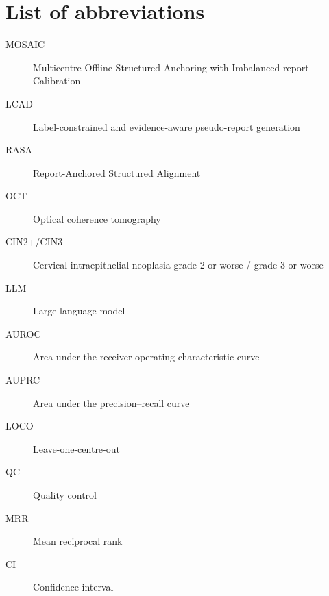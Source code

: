 \section*{List of abbreviations}
\begin{description}
  \item[MOSAIC] Multicentre Offline Structured Anchoring with Imbalanced-report Calibration
  \item[LCAD] Label-constrained and evidence-aware pseudo-report generation
  \item[RASA] Report-Anchored Structured Alignment
  \item[OCT] Optical coherence tomography
  \item[CIN2+/CIN3+] Cervical intraepithelial neoplasia grade 2 or worse / grade 3 or worse
  \item[LLM] Large language model
  \item[AUROC] Area under the receiver operating characteristic curve
  \item[AUPRC] Area under the precision--recall curve
  \item[LOCO] Leave-one-centre-out
  \item[QC] Quality control
  \item[MRR] Mean reciprocal rank
  \item[CI] Confidence interval
\end{description}
